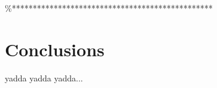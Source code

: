 \%************************************************
\chapter{Conclusions}
\label{ch_conclusions}
\acresetall

yadda yadda yadda...
